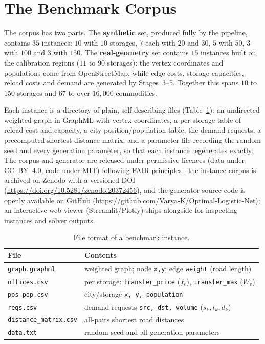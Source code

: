 \documentclass[runningheads]{llncs}
\begin{document}
\section{The Benchmark Corpus}
\label{sec:corpus}

The corpus has two parts. The \textbf{synthetic} set, produced fully by the
pipeline, contains $35$ instances: $10$ with $10$ storages, $7$ each with $20$
and $30$, $5$ with $50$, $3$ with $100$ and $3$ with $150$. The
\textbf{real-geometry} set contains $15$ instances built on the calibration
regions ($11$ to $90$ storages): the vertex coordinates and populations come from
OpenStreetMap, while edge costs, storage capacities, reload costs and demand are
generated by Stages~3--5. Together this spans $10$ to $150$ storages and $67$ to
over $16{,}000$ commodities.

Each instance is a directory of plain, self-describing files
(Table~\ref{tab:format}): an undirected weighted graph in GraphML with vertex
coordinates, a per-storage table of reload cost and capacity, a city
position/population table, the demand requests, a precomputed shortest-distance
matrix, and a parameter file recording the random seed and every generation
parameter, so that each instance regenerates exactly. The corpus and generator
are released under permissive licences (data under CC~BY~4.0, code under MIT)
following FAIR principles \cite{fair}: the instance corpus is archived on Zenodo
with a versioned DOI (\url{https://doi.org/10.5281/zenodo.20372456}), and the
generator source code is openly available on GitHub
(\url{https://github.com/Varya-K/Optimal-Logistic-Net}); an interactive web
viewer (Streamlit/Plotly) ships alongside for inspecting instances and solver
outputs.

\begin{table}[t]
\centering
\caption{File format of a benchmark instance.}
\label{tab:format}
\begin{tabular}{ll}
\toprule
File & Contents\\
\midrule
\texttt{graph.graphml}        & weighted graph; node \texttt{x,y}; edge \texttt{weight} (road length)\\
\texttt{offices.csv}          & per storage: \texttt{transfer\_price} ($f_v$), \texttt{transfer\_max} ($W_v$)\\
\texttt{pos\_pop.csv}         & city/storage \texttt{x, y, population}\\
\texttt{reqs.csv}             & demand requests \texttt{src, dst, volume} ($s_k,t_k,d_k$)\\
\texttt{distance\_matrix.csv} & all-pairs shortest road distances\\
\texttt{data.txt}             & random seed and all generation parameters\\
\bottomrule
\end{tabular}
\end{table}
\end{document}

